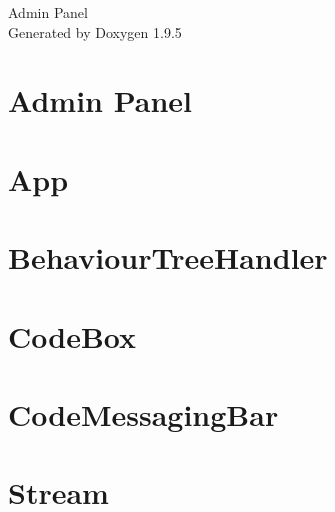 \documentclass[twoside]{book}
\newcommand{\+}{\discretionary{\mbox{\scriptsize$\hookleftarrow$}}{}{}}
\newcommand{\clearemptydoublepage}{%
    \newpage{\pagestyle{empty}\cleardoublepage}%
  }
\begin{document}
  \raggedbottom
    \hypersetup{pageanchor=false,
                bookmarksnumbered=true,
                pdfencoding=unicode
               }
  \begin{titlepage}
  \vspace*{7cm}
  \begin{center}%
  {\Large Admin Panel}\\
  \vspace*{1cm}
  {\large Generated by Doxygen 1.9.5}\\
  \end{center}
  \end{titlepage}
  \clearemptydoublepage
  \tableofcontents
  \clearemptydoublepage
  \hypersetup{pageanchor=true}
\chapter{Admin Panel}
\label{md_README}

\chapter{App}
\label{md_src_App}

\chapter{Behaviour\+Tree\+Handler}
\label{md_src_lib_BehaviourTreeHandler}

\chapter{Code\+Box}
\label{md_src_lib_home_CodeBox}

\chapter{Code\+Messaging\+Bar}
\label{md_src_lib_home_CodeMessagingBar}

\chapter{Stream}
\label{md_src_lib_home_Stream}

\end{document}

